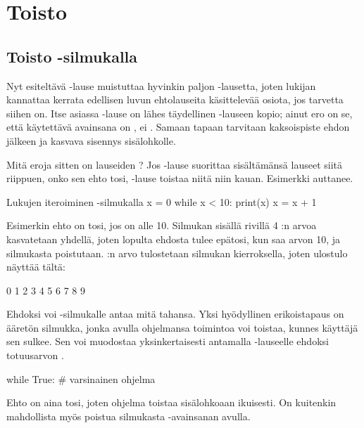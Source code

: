 \chapter{Toisto}

\section{Toisto -silmukalla}

Nyt esiteltävä -lause muistuttaa hyvinkin paljon -lausetta, joten lukijan kannattaa kerrata edellisen luvun ehtolauseita käsittelevää osiota, jos tarvetta siihen on. Itse asiassa -lause on  lähes täydellinen -lauseen kopio; ainut ero on se, että käytettävä avainsana on , ei . Samaan tapaan tarvitaan kaksoispiste ehdon jälkeen ja kasvava \gls{sisennys} sisälohkolle.

Mitä eroja sitten on lauseiden ? Jos -lause suorittaa sisältämänsä lauseet siitä riippuen, onko sen ehto tosi, -lause toistaa niitä niin kauan. Esimerkki auttanee.

\begin{example}{Lukujen iteroiminen -silmukalla}
x = 0
while x < 10:
	print(x)
	x = x + 1
\end{example}

Esimerkin ehto  on tosi, jos  on alle 10. Silmukan sisällä rivillä 4 :n arvoa kasvatetaan yhdellä, joten lopulta ehdosta tulee epätosi, kun  saa arvon 10, ja silmukasta poistutaan. :n arvo tulostetaan silmukan kierroksella, joten ulostulo näyttää tältä:

\begin{output}
0
1
2
3
4
5
6
7
8
9
\end{output}

Ehdoksi voi -silmukalle antaa mitä tahansa. Yksi hyödyllinen erikoistapaus on ääretön silmukka, jonka avulla ohjelmansa toimintoa voi toistaa, kunnes käyttäjä sen sulkee. Sen voi muodostaa yksinkertaisesti antamalla -lauseelle ehdoksi totuusarvon .

\begin{python}
while True:
	# varsinainen ohjelma
\end{python}

Ehto on aina tosi, joten ohjelma toistaa sisälohkoaan ikuisesti. On kuitenkin mahdollista myös poistua silmukasta -avainsanan avulla.

